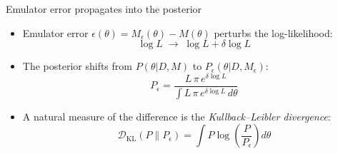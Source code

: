 \documentclass[aspectratio=169, 12pt]{beamer}
\begin{document}
\begin{frame}{Emulator error propagates into the posterior}
    \begin{itemize}
        \item Emulator error $\epsilon(\theta) = M_\epsilon(\theta) - M(\theta)$
              perturbs the log-likelihood:
              \[
                  \log L \;\longrightarrow\; \log L + \delta \log L
              \]
        \item The posterior shifts from $P(\theta|D,M)$ to $P_\epsilon(\theta|D,M_\epsilon)$:
              \[
                  P_\epsilon = \frac{L\,\pi\,e^{\delta \log L}}
                  {\int L\,\pi\,e^{\delta \log L}\,d\theta}
              \]
        \item A natural measure of the difference is the
              \textit{Kullback--Leibler divergence}:
              \[
                  \mathcal{D}_\mathrm{KL}(P \| P_\epsilon)
                  = \int P \log\!\left(\frac{P}{P_\epsilon}\right) d\theta
              \]
    \end{itemize}
\end{frame}
\end{document}
